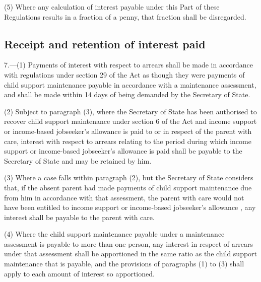 \documentclass[12pt,a4paper]{article}
\begin{document}
(5) Where any calculation of interest payable under this Part of these Regulations results in a fraction of a penny, that fraction shall be disregarded.


\subsection[7. Receipt and retention of interest paid]{Receipt and retention of interest paid}

7.—(1) Payments of interest with respect to arrears shall be made in accordance with regulations under section 29 of the Act as though they were payments of child support maintenance payable in accordance with a maintenance assessment, and shall be made within 14 days of being demanded by the Secretary of State.

(2) Subject to paragraph (3), where the Secretary of State has been authorised to recover child support maintenance under section 6 of the Act and income support
or income-based jobseeker’s allowance  %
is paid to or in respect of the parent with care, interest with respect to arrears relating to the period during which income support 
or income-based jobseeker’s allowance  %
is paid shall be payable to the Secretary of State and may be retained by him.

(3) Where a case falls within paragraph (2), but the Secretary of State considers that, if the absent parent had made payments of child support maintenance due from him in accordance with that assessment, the parent with care would not have been entitled to income support
or income-based jobseeker’s allowance%
, any interest shall be payable to the parent with care.

(4) Where the child support maintenance payable under a maintenance assessment is payable to more than one person, any interest in respect of arrears under that assessment shall be apportioned in the same ratio as the child support maintenance that is payable, and the provisions of paragraphs (1) to (3) shall apply to each amount of interest so apportioned.

\end{document}
